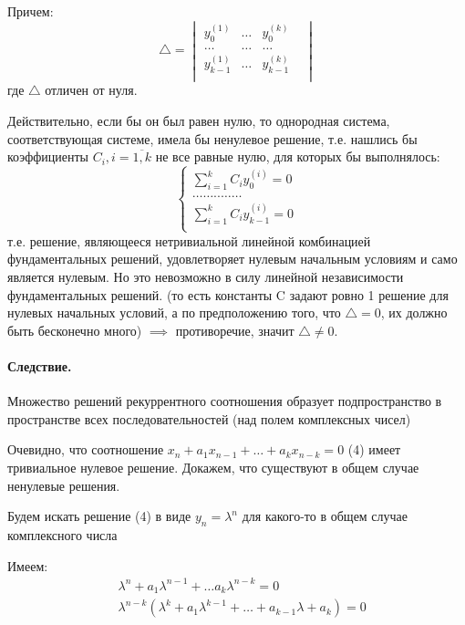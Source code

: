 \documentclass{report}
\begin{document}
Причем:
\[
	\triangle = \begin{vmatrix}
		y_{0}^{(1)}& \ldots& y_{0}^{(k)}&\\
		\ldots& \ldots& \ldots& \\
		y_{k-1}^{(1)}& \ldots& y_{k-1}^{(k)}&\\
	\end{vmatrix}
\] 
где $\triangle$ отличен от нуля.

Действительно, если бы он был равен нулю, то однородная
система, соответствующая системе, имела бы ненулевое
решение, т.е. нашлись бы коэффициенты $C_{i}, i = \overline{1,k}$ не все
равные нулю, для которых бы выполнялось:
\[
\begin{cases}
	\sum\limits_{i=1}^{k}C_{i}y_0^{(i)} = 0\\
	\ldots\ldots..\ldots\ldots\\
	\sum\limits_{i=1}^{k}C_{i}y_{k-1}^{(i)} = 0\\
\end{cases}
\] 
т.е. решение, являющееся нетривиальной линейной комбинацией
фундаментальных решений, удовлетворяет нулевым начальным
условиям и само является
нулевым. Но это невозможно в силу линейной независимости
фундаментальных решений. (то есть константы C задают ровно 1 решение для 
нулевых начальных условий, а по предположению того, что $\triangle = 0$, их
должно быть бесконечно много) $\implies$ противоречие, значит $\triangle \neq 0$.

\paragraph*{Следствие.}
Множество решений рекуррентного соотношения образует подпространство
в пространстве всех последовательностей (над полем комплексных чисел)

\medskip

Очевидно, что соотношение $x_{n} + a_1x_{n-1} + \ldots + a_{k}x_{n-k} = 0$ (4) имеет
тривиальное нулевое решение. Докажем, что существуют в общем случае ненулевые решения.

Будем искать решение (4) в виде $y_{n} = \lambda^{n}$ для какого-то
в общем случае комплексного числа \lambda

\medskip

Имеем:
\[
\begin{align*}
&\lambda^{n} + a_1\lambda^{n-1} + \ldots a_{k}\lambda^{n-k} = 0 \\
&\lambda^{n-k}(\lambda^{k} + a_1\lambda^{k-1} + \ldots + a_{k-1}\lambda + a_{k}) = 0 \\
\end{align*}
\] 
\end{document}
